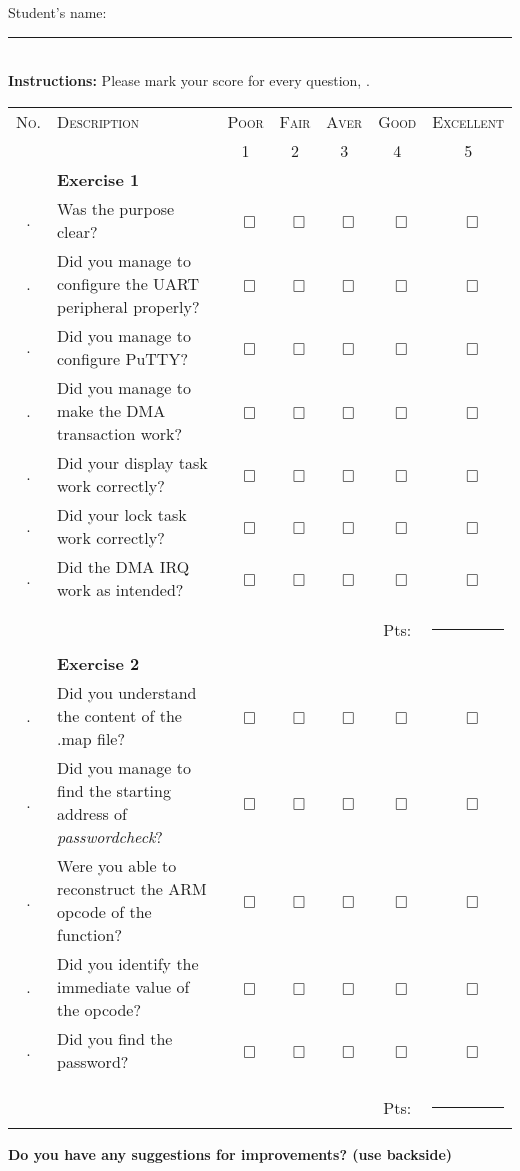 \documentclass[letterpaper]{article}
\newcounter{hnumber}
\newcounter{qnumber}
\newcommand{\yesno}{{\Large ~$\Box$}}
\newcommand{\question}[1]{
    \hfill \relax \thehnumber.\theqnumber\hfill\hfill &\textsf{#1} &{\small\yesno} & {\small\yesno} &{\small\yesno} &{\small\yesno}&{\small\yesno}\stepcounter{qnumber}\\
}
\newcommand{\heading}[1]{
	\stepcounter{hnumber}
	\thehnumber &\multicolumn{4}{l}{\bf\textsf{#1}} \\ \midrule%
	}
\begin{document}
\centering
Student's name: \rule{6cm}{0.5pt}\\

\textbf{Instructions:} Please mark your score for every question, .

\begin{longtable}{c p{8cm}ccccc}
\textsc{No.} &\textsc{Description}&\footnotesize \textsc{Poor} & \footnotesize \textsc{Fair} & \footnotesize \textsc{Aver}& \footnotesize \textsc{Good}&\footnotesize \textsc{Excellent}\\
& & 1&2&3&4&5\\
\heading{Exercise 1 }
\question{Was the purpose clear?}
\question{Did you manage to configure the UART peripheral properly?}
\question{Did you manage to configure PuTTY?}
\question{Did you manage to make the DMA transaction work?}
\question{Did your display task work correctly?}
\question{Did your lock task work correctly?}
\question{Did the DMA IRQ work as intended?}
\\

&&&&&Pts:&\rule{1.5cm}{0.5pt}\\
\setcounter{qnumber}{0}
\stepcounter{qnumber}
\heading{Exercise 2}
\question{Did you understand the content of the .map file?}
\question{Did you manage to find the starting address of \emph{passwordcheck}?}
\question{Were you able to reconstruct the ARM opcode of the function?}
\question{Did you identify the immediate value of the opcode?}
\question{Did you find the password?}
\\



\\&&&&&Pts:&\rule{1.5cm}{0.5pt}\\
\bottomrule
\end{longtable}

\small \noindent \bf Do you have any suggestions for improvements? (use backside)
\\ 
\vspace{2cm}
\end{document}
